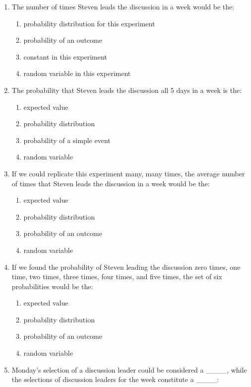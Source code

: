 \documentclass[]{article}
\begin{document}
\begin{enumerate}
\def\labelenumi{\arabic{enumi}.}
\setcounter{enumi}{22}
\item
  The number of times Steven leads the discussion in a week would be
  the:

  \begin{enumerate}
  \def\labelenumii{\alph{enumii}.}
  \item
    probability distribution for this experiment
  \item
    probability of an outcome
  \item
    constant in this experiment
  \item
    random variable in this experiment
  \end{enumerate}
\item
  The probability that Steven leads the discussion all 5 days in a week
  is the:

  \begin{enumerate}
  \def\labelenumii{\alph{enumii}.}
  \item
    expected value
  \item
    probability distribution
  \item
    probability of a simple event
  \item
    random variable
  \end{enumerate}
\item
  If we could replicate this experiment many, many times, the average
  number of times that Steven leads the discussion in a week would be
  the:

  \begin{enumerate}
  \def\labelenumii{\alph{enumii}.}
  \item
    expected value
  \item
    probability distribution
  \item
    probability of an outcome
  \item
    random variable
  \end{enumerate}
\item
  If we found the probability of Steven leading the discussion zero
  times, one time, two times, three times, four times, and five times,
  the set of six probabilities would be the:

  \begin{enumerate}
  \def\labelenumii{\alph{enumii}.}
  \item
    expected value
  \item
    probability distribution
  \item
    probability of an outcome
  \item
    random variable
  \end{enumerate}
\item
  Monday's selection of a discussion leader could be considered a
  \_\_\_\_, while the selections of discussion leaders for the week
  constitute a \_\_\_\_:


\end{enumerate}
\end{document}
